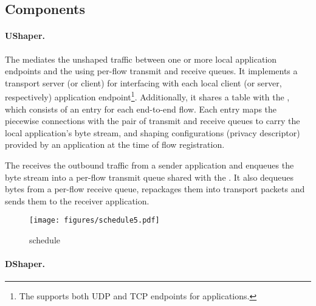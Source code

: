 \subsection{Components}
\label{subsec:impl-mediation}
\paragraph{UShaper.}
The {\ushaper} mediates the unshaped traffic between one or more local
application endpoints and the {\dshaper} using per-flow transmit and receive
queues.
It implements a transport server (or client) for interfacing with each local
client (or server, respectively) application endpoint\footnote{The {\ushaper}
supports both UDP and TCP endpoints for applications.}.
Additionally, it shares a {\flowmap} table with the {\dshaper},
which consists of an entry for each end-to-end flow. Each entry maps the
piecewise connections with
the pair of transmit and receive queues to carry the local application's byte
stream, and shaping configurations (\eg privacy descriptor) provided by an
application at the time of flow registration.

The {\ushaper} receives the outbound traffic from a sender application
and enqueues the byte stream into a per-flow transmit queue shared with the
{\dshaper}.
It also dequeues bytes from a per-flow receive queue, repackages them
into transport packets and sends them to the receiver application.

\begin{figure}[t]
    \centering
    \texttt{[image: figures/schedule5.pdf]}
    \caption{{\dshaper} schedule}
    \label{fig:middlebox-schedule}
\end{figure}

\paragraph{DShaper.}

